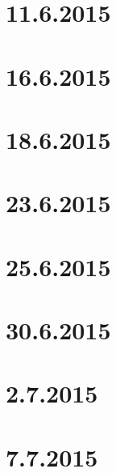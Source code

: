 \documentclass[12pt,twoside]{article}
\begin{document}
\section{11.6.2015}

\newpage
\section{16.6.2015}

\section{18.6.2015}

\section{23.6.2015}

\newpage
\section{25.6.2015}

\section{30.6.2015}

\section{2.7.2015}

\section{7.7.2015}

%
\end{document}
